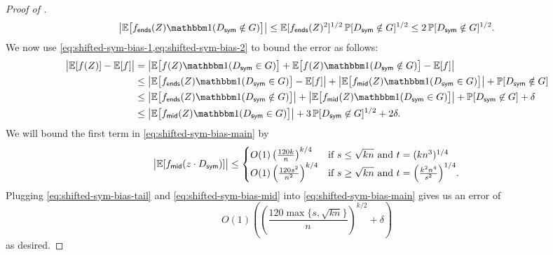 \documentclass[10pt,a4paper]{article}
\theoremstyle{definition}
\renewcommand{\Pr}{\mathop{\mathbb{P}\/}}
\newcommand{\E}{\mathop{\mathbb{E}\/}}
\newcommand{\bbone}{\mathbbm 1}
\newcommand{\Id}{\bbone}
\DeclarePairedDelimiter\abs{\lvert}{\rvert}
\def\sym{\mathsf{sym}}
\def\ends{\mathsf{ends}}
\def\middle{\mathsf{mid}}
\begin{document}
\begin{proof}[Proof of ]
\begin{align}
    \abs[\big]{ \E\bigl[f_{\ends}(Z) \Id (D_\sym \notin G) \bigr]  }
    \le \E[f_{\ends}(Z)^2 ]^{1/2} \Pr[D_\sym \notin G]^{1/2}
    \le 2 \Pr[D_\sym \notin G]^{1/2} .
  \end{align}
  We now use \cref{eq:shifted-sym-bias-1,eq:shifted-sym-bias-2} to bound the error as follows:
  \begin{align}
    \abs[\big]{ \E[f(Z)] - \E[f] }
    &=  \abs[\big]{ \E\bigl[f(Z) \Id(D_\sym \in G) \bigr] +\E\bigl[f(Z) \Id( D_\sym \notin G)\bigr] - \E[f]  } \nonumber  \\
    &\le \abs[\big]{ \E\bigl[f_{\ends}(Z) \Id(D_\sym \in G)\bigr] - \E[f]  } +\abs[\big]{\E\bigl[f_{\middle}(Z) \Id(D_\sym \in G)\bigr]} + \Pr [D_\sym \notin G] \nonumber  \\
    &\le \abs[\big]{ \E\bigl[f_{\ends}(Z) \Id(D_\sym \notin G)\bigr]  }  + \abs[\big]{\E\bigl[f_{\middle}(Z) \Id(D_\sym \in G)\bigr]} + \Pr[D_\sym \not\in G] + \delta \nonumber \\ 
    &\le \abs[\big]{ \E\bigl[f_{\middle}(Z) \Id(D_\sym \in G)\bigr] } + 3 \Pr[D_\sym \not\in G]^{1/2} + 2\delta . \label{eq:shifted-sym-bias-main}
  \end{align}
  We will bound the first term in \cref{eq:shifted-sym-bias-main} by
  \begin{align} \label{eq:shifted-sym-bias-mid}
    \abs[\big]{\E[f_{\middle}(z \cdot D_{\sym})]}
    \le \begin{cases} O(1) \left( \frac{120k}{n} \right)^{k/4} & \text{if $s \le \sqrt{kn}$ and $t = (k n^3)^{1/4}$} \\
    O(1) \left(\frac{120s^2}{n^2}\right)^{k/4} & \text{if $s \ge \sqrt{kn}$ and $t = \left(\frac{k^2n^4}{s^2}\right)^{1/4}$.} \end{cases}
  \end{align}
  Plugging \cref{eq:shifted-sym-bias-tail} and \cref{eq:shifted-sym-bias-mid} into \cref{eq:shifted-sym-bias-main} gives us an error of 
  \[
    O(1) \left( \left( \frac{120 \max\{s, \sqrt{kn}\}}{n} \right)^{k/2} + \delta \right) 
  \]
  as desired.

  \medskip


\end{proof}
\end{document}
